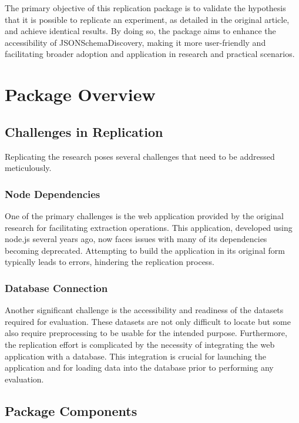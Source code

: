\documentclass[sigconf, nonacm]{acmart}
\begin{document}
The primary objective of this replication package is to validate the hypothesis that it is possible to replicate an experiment, as detailed in the original article, and achieve identical results. By doing so, the package aims to enhance the accessibility of JSONSchemaDiscovery, making it more user-friendly and facilitating broader adoption and application in research and practical scenarios.

\section{Package Overview}

\subsection{Challenges in Replication}

Replicating the research poses several challenges that need to be addressed meticulously. 

\subsubsection{Node Dependencies}

One of the primary challenges is the web application provided by the original research for facilitating extraction operations. This application, developed using node.js several years ago, now faces issues with many of its dependencies becoming deprecated. Attempting to build the application in its original form typically leads to errors, hindering the replication process. 

\subsubsection{Database Connection}

Another significant challenge is the accessibility and readiness of the datasets required for evaluation. These datasets are not only difficult to locate but some also require preprocessing to be usable for the intended purpose. Furthermore, the replication effort is complicated by the necessity of integrating the web application with a database. This integration is crucial for launching the application and for loading data into the database prior to performing any evaluation.

\subsection{Package Components}
\end{document}
